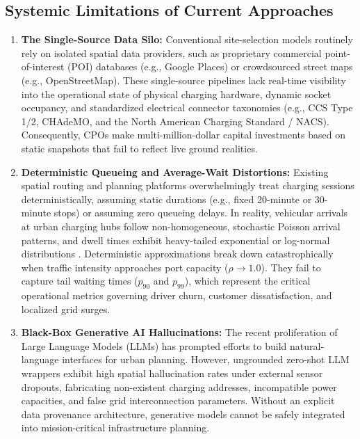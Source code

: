 \documentclass[preprint,12pt,authoryear]{elsarticle}
\begin{document}
\subsection{Systemic Limitations of Current Approaches}
\begin{enumerate}
    \item \textbf{The Single-Source Data Silo:} Conventional site-selection models routinely rely on isolated spatial data providers, such as proprietary commercial point-of-interest (POI) databases (e.g., Google Places) or crowdsourced street maps (e.g., OpenStreetMap). These single-source pipelines lack real-time visibility into the operational state of physical charging hardware, dynamic socket occupancy, and standardized electrical connector taxonomies (e.g., CCS Type 1/2, CHAdeMO, and the North American Charging Standard / NACS). Consequently, CPOs make multi-million-dollar capital investments based on static snapshots that fail to reflect live ground realities.
    
    \item \textbf{Deterministic Queueing and Average-Wait Distortions:} Existing spatial routing and planning platforms overwhelmingly treat charging sessions deterministically, assuming static durations (e.g., fixed 20-minute or 30-minute stops) or assuming zero queueing delays. In reality, vehicular arrivals at urban charging hubs follow non-homogeneous, stochastic Poisson arrival patterns, and dwell times exhibit heavy-tailed exponential or log-normal distributions \citep{li2022stochastic, alizadeh2021queue}. Deterministic approximations break down catastrophically when traffic intensity approaches port capacity ($\rho \to 1.0$). They fail to capture tail waiting times ($p_{90}$ and $p_{99}$), which represent the critical operational metrics governing driver churn, customer dissatisfaction, and localized grid surges.
    
    \item \textbf{Black-Box Generative AI Hallucinations:} The recent proliferation of Large Language Models (LLMs) has prompted efforts to build natural-language interfaces for urban planning. However, ungrounded zero-shot LLM wrappers exhibit high spatial hallucination rates under external sensor dropouts, fabricating non-existent charging addresses, incompatible power capacities, and false grid interconnection parameters. Without an explicit data provenance architecture, generative models cannot be safely integrated into mission-critical infrastructure planning.
\end{enumerate}
\end{document}
